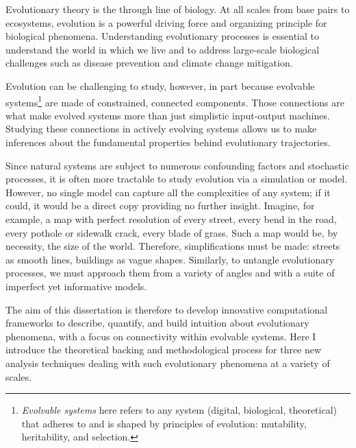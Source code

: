 Evolutionary theory is the through line of biology. At all scales from base pairs to ecosystems, evolution is a powerful driving force and organizing principle for biological phenomena. Understanding evolutionary processes is essential to understand the world in which we live and to address large-scale biological challenges such as disease prevention and climate change mitigation.

Evolution can be challenging to study, however, in part because evolvable systems\footnote{\textit{Evolvable systems }here refers to any system (digital, biological, theoretical) that adheres to and is shaped by principles of evolution: mutability, heritability, and selection.} are made of constrained, connected components. Those connections are what make evolved systems more than just simplistic input-output machines. Studying these connections in actively evolving systems allows us to make inferences about the fundamental properties behind evolutionary trajectories.

Since natural systems are subject to numerous confounding factors and stochastic processes, it is often more tractable to study evolution via a simulation or model. However, no single model can capture all the complexities of any system; if it could, it would be a direct copy providing no further insight. Imagine, for example, a map with perfect resolution of every street, every bend in the road, every pothole or sidewalk crack, every blade of grass. Such a map would be, by necessity, the size of the world. Therefore, simplifications must be made: streets as smooth lines, buildings as vague shapes. Similarly, to untangle evolutionary processes, we must approach them from a variety of angles and with a suite of imperfect yet informative models. 

The aim of this dissertation is therefore to develop innovative computational frameworks to describe, quantify, and build intuition about evolutionary phenomena, with a focus on connectivity within evolvable systems. Here I introduce the theoretical backing and methodological process for three new analysis techniques dealing with such evolutionary phenomena at a variety of scales.
